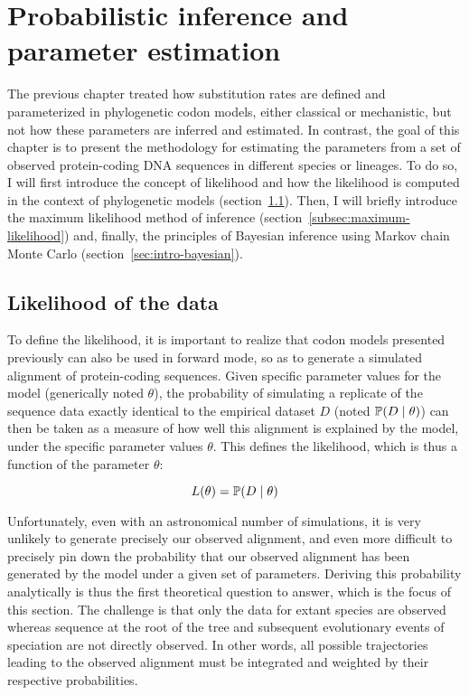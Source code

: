 \chapter{Probabilistic inference and parameter estimation}
{\hypersetup{linkcolor=GREYDARK}\minitoc}
\label{chap:intro-inference}

The previous chapter treated how substitution rates are defined and parameterized in phylogenetic codon models, either classical or mechanistic, but not how these parameters are inferred and estimated.
In contrast, the goal of this chapter is to present the methodology for estimating the parameters from a set of observed protein-coding \acrshort{DNA} sequences in different species or lineages.
To do so, I will first introduce the concept of likelihood and how the likelihood is computed in the context of phylogenetic models (section~\ref{sec-intro:likelihood}).
Then, I will briefly introduce the maximum likelihood method of inference (section~\ref{subsec:maximum-likelihood}) and, finally, the principles of Bayesian inference using Markov chain Monte Carlo (section~\ref{sec:intro-bayesian}).


\section{Likelihood of the data}
\label{sec-intro:likelihood}

To define the likelihood, it is important to realize that codon models presented previously can also be used in forward mode, so as to generate a simulated alignment of protein-coding sequences.
Given specific parameter values for the model (generically noted $\theta$), the probability of simulating a replicate of the sequence data exactly identical to the empirical dataset $D$ (noted $\mathbb{P} (D \mid \theta)$) can then be taken as a measure of how well this alignment is explained by the model, under the specific parameter values $\theta$.
This defines the likelihood, which is thus a function of the parameter $\theta$:

\begin{equation}
    L(\theta) = \mathbb{P} (D \mid \theta)
\end{equation}

Unfortunately, even with an astronomical number of simulations, it is very unlikely to generate precisely our observed alignment, and even more difficult to precisely pin down the probability that our observed alignment has been generated by the model under a given set of parameters.
Deriving this probability analytically is thus the first theoretical question to answer, which is the focus of this section.
The challenge is that only the data for extant species are observed whereas sequence at the root of the tree and subsequent evolutionary events of speciation are not directly observed.
In other words, all possible trajectories leading to the observed alignment must be integrated and weighted by their respective probabilities.

